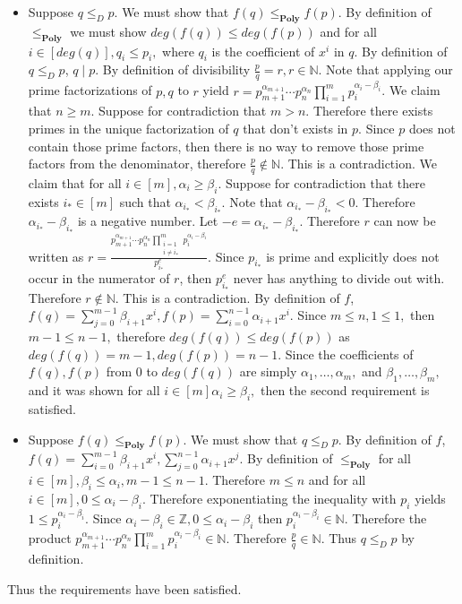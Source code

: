 \documentclass[12pt, letterpaper]{article}
\newcommand{\Z}{\mathbb{Z}}
\newcommand{\N}{\mathbb{N}}
\newcommand{\poly}{\textbf{Poly}}
\begin{document}
	\begin{itemize}
		\item Suppose $q \leq_D p$.  We must show that $f(q) \leq_\poly f(p).$  By definition of $\leq_\poly$ we must show $deg(f(q)) \leq deg(f(p))$ and for all $i \in [deg(q)], q_i \leq p_i,$ where $q_i$ is the coefficient of $x^i$ in $q$.  By definition of $q \leq_D p$, $q \mid p.$  By definition of divisibility $\frac{p}{q} = r, r \in \N.$  Note that applying our prime factorizations of $p,q$ to $r$ yield $r = p_{m+1}^{\alpha_{m+1}}\cdots p_n^{\alpha_n}\prod_{i=1}^m p_i^{\alpha_i - \beta_i}$.  We claim that $n \geq m.$  Suppose for contradiction that $m > n.$  Therefore there exists primes in the unique factorization of $q$ that don't exists in $p$.  Since $p$ does not contain those prime factors, then there is no way to remove those prime factors from the denominator, therefore $\frac{p}{q} \not\in \N.$  This is a contradiction.  We claim that for all $i \in [m], \alpha_i \geq \beta_i.$  Suppose for contradiction that there exists $i_* \in [m]$ such that $\alpha_{i_*} < \beta_{i_*}.$  Note that $\alpha_{i_*} - \beta_{i_*} < 0.$  Therefore $\alpha_{i_*} - \beta_{i_*}$ is a negative number.  Let $-e=\alpha_{i_*} - \beta_{i_*}.$ Therefore $r$ can now be written as $r=\frac{p_{m+1}^{\alpha_{m+1}}\cdots p_n^{\alpha_n}\prod_{\substack{i=1\\i \neq i_*}}^m p_i^{\alpha_i - \beta_i}}{p_{i_*}^e}$.  Since $p_{i_*}$ is prime and explicitly does not occur in the numerator of $r$, then $p_{i_*}^{e}$ never has anything to divide out with.  Therefore $r \not \in \N.$  This is a contradiction.  By definition of $f$, $f(q) = \sum_{j=0}^{m-1} \beta_{i+1}x^i, f(p) = \sum_{i=0 }^{n-1}\alpha_{i+1}x^i.$  Since $m \leq n, 1 \leq 1,$ then $m-1 \leq n-1,$ therefore $deg(f(q)) \leq deg(f(p))$ as $deg(f(q)) = m - 1,deg(f(p)) = n - 1.$  Since the coefficients of $f(q),f(p)$ from $0$ to $deg(f(q))$ are simply $\alpha_1,\ldots,\alpha_m,$ and $\beta_1,\ldots,\beta_m,$ and it was shown for all $i \in [m] \alpha_i \geq \beta_i,$ then the second requirement is satisfied.  
		\item Suppose $f(q) \leq_\poly f(p).$  We must show that $q \leq_D p.$  By definition of $f$, $f(q) = \sum_{i=0}^{m-1} \beta_{i+1}x^i, \sum_{j=0}^{n-1} \alpha_{i+1} x^j.$  By definition of $\leq_\poly$ for all $i \in [m], \beta_i \leq \alpha_i, m-1 \leq n-1.$  Therefore $m \leq n$ and for all $i \in [m], 0 \leq \alpha_i - \beta_i.$  Therefore exponentiating the inequality with $p_i$ yields $1 \leq p_i^{\alpha_i - \beta_i}$.  Since $\alpha_i - \beta_i \in \Z,  0 \leq \alpha_i - \beta_i$ then $p_i^{\alpha_i - \beta_i} \in \N$.  Therefore the product $p_{m+1}^{\alpha_{m+1}}\cdots p_{n}^{\alpha_{n}}\prod_{i=1}^m p_i^{\alpha_i - \beta_i} \in \N.$  Therefore $\frac{p}{q} \in \N.$  Thus $q \leq_D p$ by definition.
	\end{itemize}
	Thus the requirements have been satisfied.  
\end{document}
